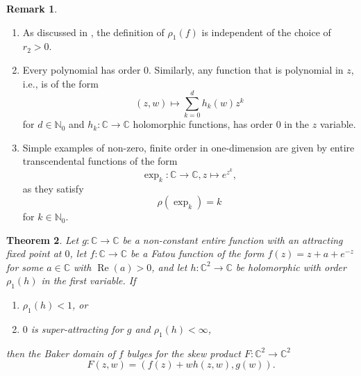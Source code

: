 \documentclass[a4paper, 12pt, twoside]{amsart}
\newtheorem{thm}{Theorem}[section]
\newtheorem{lem}[thm]{Lemma}
\theoremstyle{definition}
\newtheorem{rem}[thm]{Remark}
\numberwithin{equation}{section}
\renewcommand{\Re}{\operatorname{Re}}
\begin{document}
\begin{rem}\label{REMARK:OrderOfAFunction}
	\begin{enumerate}
		\item As discussed in \cite[Section 1.2]{Ronkin1989}, the definition of $\rho_1(f)$ is independent of the choice of $r_2 > 0$.
		\item Every polynomial has order $0$. Similarly, any function that is polynomial in $z$, i.e., is of the form
		\begin{equation*}
			(z,w) \mapsto \sum_{k=0}^{d} h_k(w) z^k
		\end{equation*}
		for $d \in \mathbb{N}_{0}$ and $h_k : \mathbb{C} \to \mathbb{C}$ holomorphic functions, has order $0$ in the $z$ variable.
		\item Simple examples of non-zero, finite order in one-dimension are given by entire transcendental functions of the form
		\begin{equation*}
			\exp_k : \mathbb{C} \to \mathbb{C}, z \mapsto e^{z^k},
		\end{equation*}
		as they satisfy
		\begin{equation*}
			\rho(\exp_k) = k
		\end{equation*}
		for $k \in \mathbb{N}_{0}$.
	\end{enumerate}
\end{rem}

%

\begin{thm}\label{Theorem:BakerProductErrorTEF}
	Let $g : \mathbb{C}\to\mathbb{C}$ be a non-constant entire function with an attracting fixed point at $0$, let $f : \mathbb{C} \to \mathbb{C}$ be a Fatou function of the form $f(z) = z + a + e^{-z}$ for some $a \in \mathbb{C} $ with $\Re(a) > 0$, and let $h : \mathbb{C}^2 \to \mathbb{C}$ be holomorphic with order $\rho_1(h)$ in the first variable. If 
	\begin{enumerate}
		\item $\rho_1(h) < 1$, or
		\item $0$ is super-attracting for $g$ and $\rho_1(h) < \infty$,
	\end{enumerate}
	then the Baker domain of $f$ bulges for the skew product $F : \mathbb{C}^2 \to \mathbb{C}^2$
	\begin{equation*}
		F(z,w) = (f(z) + wh(z,w), g(w)).
	\end{equation*}	
\end{thm}
\end{document}
